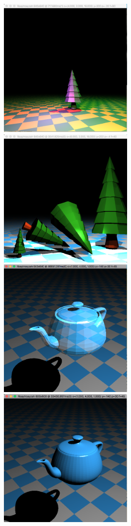 \includegraphics[width=0.5\textwidth]{img/colourLitTree}
\includegraphics[width=0.5\textwidth]{img/fallingTrees}
\includegraphics[width=0.5\textwidth]{img/ghostTeapot}
\includegraphics[width=0.5\textwidth]{img/hiresTeapot}
